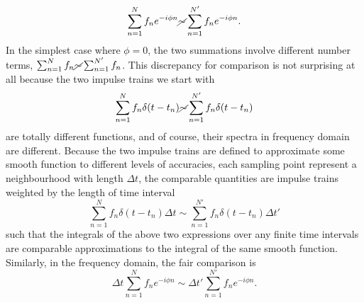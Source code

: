 \documentclass[
10pt, %
a4paper, %
oneside, %
headinclude,footinclude, %
BCOR5mm, %
]{scrartcl}
\begin{document}
\begin{equation}
\sum_{n=1}^{N} f_n e^{-i\phi n } \cancel{\sim} \sum_{n=1}^{N'} f_n e^{-i\phi n }.
\end{equation}
In the simplest case where $\phi=0$, the two summations involve different number terms, $\sum_{n=1}^{N} f_n \cancel{\sim} \sum_{n=1}^{N'} f_n$. This discrepancy for comparison is not surprising at all because the two impulse trains we start with
\begin{equation}
\sum_{n=1}^{N} f_n \delta(t-t_n) \cancel{\sim} \sum_{n=1}^{N'} f_n \delta(t-t_n)
\end{equation}
are totally different functions, and of course, their spectra in frequency domain are different. Because the two impulse trains are defined to approximate some smooth function to different levels of accuracies, each sampling point represent a neighbourhood with length $\Delta t$, the comparable quantities are impulse trains weighted by the length of time interval
\begin{equation}
\sum_{n=1}^{N} f_n \delta(t-t_n) \Delta t \sim \sum_{n=1}^{N'} f_n \delta(t-t_n) \Delta t'
\end{equation}
such that the integrals of the above two expressions over any finite time intervals are comparable approximations to the integral of the same smooth function. Similarly, in the frequency domain, the fair comparison is
\begin{equation}
\Delta t\sum_{n=1}^{N} f_n e^{-i\phi n } \sim \Delta t'\sum_{n=1}^{N'} f_n e^{-i\phi n }.
\end{equation}



\end{document}
